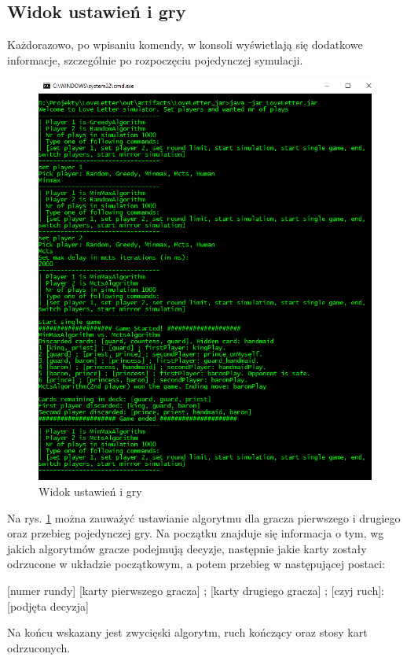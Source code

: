 \subsection*{Widok ustawień i gry}
Każdorazowo, po wpisaniu komendy, w konsoli wyświetlają się dodatkowe informacje, szczególnie po rozpoczęciu pojedynczej symulacji.
\begin{figure}[H]
	\centering
	\includegraphics[width=\textwidth]{Resources/cli2.PNG}
	\caption{Widok ustawień i gry} 
	\label{fig:cli2}
\end{figure}

Na rys. \ref{fig:cli2} można zauważyć ustawianie algorytmu dla gracza pierwszego i drugiego oraz przebieg pojedynczej gry. Na początku znajduje się informacja o tym, wg jakich algorytmów gracze podejmują decyzje, następnie jakie karty zostały odrzucone w układzie początkowym, a potem przebieg w następującej postaci:
\begin{center}
	[numer rundy] [karty pierwszego gracza] ; [karty drugiego gracza] ; [czyj ruch]: [podjęta decyzja]
\end{center}
Na końcu wskazany jest zwycięski algorytm, ruch kończący oraz stosy kart odrzuconych.


